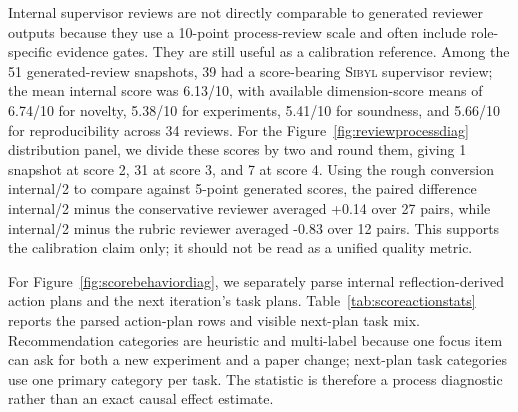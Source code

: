 \documentclass{article}
\newcommand{\sibyl}{\textsc{Sibyl}}
\begin{document}
Internal supervisor reviews are not directly comparable to generated reviewer outputs because they use a 10-point process-review scale and often include role-specific evidence gates. They are still useful as a calibration reference. Among the 51 generated-review snapshots, 39 had a score-bearing \sibyl{} supervisor review; the mean internal score was 6.13/10, with available dimension-score means of 6.74/10 for novelty, 5.38/10 for experiments, 5.41/10 for soundness, and 5.66/10 for reproducibility across 34 reviews. For the Figure~\ref{fig:reviewprocessdiag} distribution panel, we divide these scores by two and round them, giving 1 snapshot at score 2, 31 at score 3, and 7 at score 4. Using the rough conversion internal/2 to compare against 5-point generated scores, the paired difference internal/2 minus the conservative reviewer averaged +0.14 over 27 pairs, while internal/2 minus the rubric reviewer averaged -0.83 over 12 pairs. This supports the calibration claim only; it should not be read as a unified quality metric.

For Figure~\ref{fig:scorebehaviordiag}, we separately parse internal reflection-derived action plans and the next iteration's task plans. Table~\ref{tab:scoreactionstats} reports the parsed action-plan rows and visible next-plan task mix. Recommendation categories are heuristic and multi-label because one focus item can ask for both a new experiment and a paper change; next-plan task categories use one primary category per task. The statistic is therefore a process diagnostic rather than an exact causal effect estimate.
\end{document}
